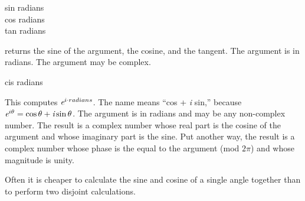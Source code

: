 \begin{defun}[Function]
sin radians \\
cos radians \\
tan radians

 returns the sine of the argument,  the cosine,
and  the tangent.  The argument is in radians.
The argument may be complex.
\end{defun}

\begin{defun}[Function]
cis radians

This computes $ \emph{e} ^ {i \cdot radians} $.
The name  means ``cos + \emph{i} sin,'' because
$ \emph{e} ^{ i \theta } = \cos \theta + \emph{i} \sin \theta $.
The argument is in
radians and may be any non-complex number.  The result is a complex
number whose real part is the cosine of the argument and whose imaginary
part is the sine.  Put another way, the result is a complex number whose
phase is the equal to the argument (mod $2\pi$)
and whose magnitude is unity.

\beforenoterule
\begin{implementation}
Often it is cheaper to calculate the sine and cosine
of a single angle together than to perform two disjoint calculations.
\end{implementation}
\afternoterule
\end{defun}

